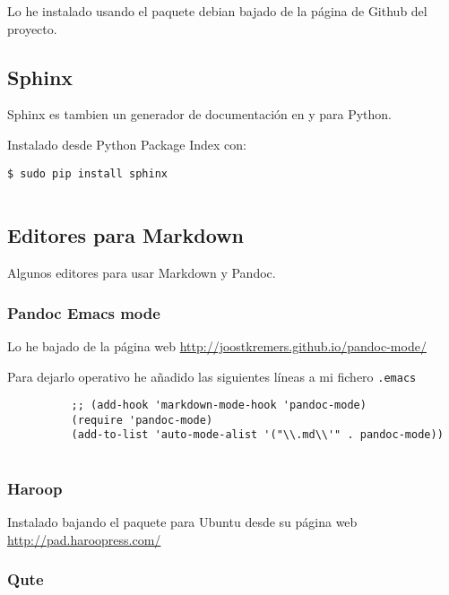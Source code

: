 Lo he instalado usando el paquete debian bajado de la página de Github
del proyecto.

\subsection{Sphinx}\label{sphinx}

Sphinx es tambien un generador de documentación en y para Python.

Instalado desde Python Package Index con:

\begin{verbatim}
$ sudo pip install sphinx
      
\end{verbatim}

\subsection{Editores para Markdown}\label{editores-para-markdown}

Algunos editores para usar Markdown y Pandoc.

\subsubsection{Pandoc Emacs mode}\label{pandoc-emacs-mode}

Lo he bajado de la página web
\url{http://joostkremers.github.io/pandoc-mode/}

Para dejarlo operativo he añadido las siguientes líneas a mi fichero
\texttt{.emacs}

\begin{verbatim}
          ;; (add-hook 'markdown-mode-hook 'pandoc-mode)
          (require 'pandoc-mode)
          (add-to-list 'auto-mode-alist '("\\.md\\'" . pandoc-mode))       
        
\end{verbatim}

\subsubsection{Haroop}\label{haroop}

Instalado bajando el paquete para Ubuntu desde su página web
\url{http://pad.haroopress.com/}

\subsubsection{Qute}\label{qute}

